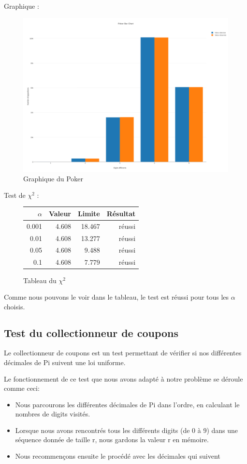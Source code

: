 \documentclass[10pt,a4paper]{article}
\begin{document}
	Graphique :
	\begin{figure}[h]
		\centering
		\includegraphics[scale=0.25]{../chart_images/poker_bar_chart.png}
		\caption{Graphique du Poker}
	\end{figure}
	
	\newpage
	Test de $\chi^2$ :
	\begin{figure}[h]
		\centering
		\begin{tabular}{|r|r|r|r|}
			\hline
			$\alpha$ & Valeur & Limite & Résultat\\
			\hline
			0.001 & 4.608 & 18.467 & réussi\\
			0.01 & 4.608 & 13.277 & réussi\\
			0.05 & 4.608 & 9.488 & réussi\\
			0.1 & 4.608 & 7.779 & réussi\\
			\hline
		\end{tabular}
		\caption{Tableau du $\chi^2$}
	\end{figure}
	
	Comme nous pouvons le voir dans le tableau, le test est réussi pour tous les $\alpha$ choisis.	
		
\newpage
	
\subsection{Test du collectionneur de coupons}
Le collectionneur de coupons est un test permettant de vérifier si nos différentes décimales de Pi suivent une loi uniforme.
 
Le fonctionnement de ce test que nous avons adapté à notre problème se déroule comme ceci:  
\begin{itemize}
\item Nous parcourons les différentes décimales de Pi dans l'ordre, en calculant le nombres de digits visités.
\item Lorsque nous avons rencontrés tous les différents digits (de 0 à 9) dans une séquence donnée de taille r, nous gardons la valeur r en mémoire.
\item Nous recommençons ensuite le procédé avec les décimales qui suivent 
\end{itemize}
\end{document}
